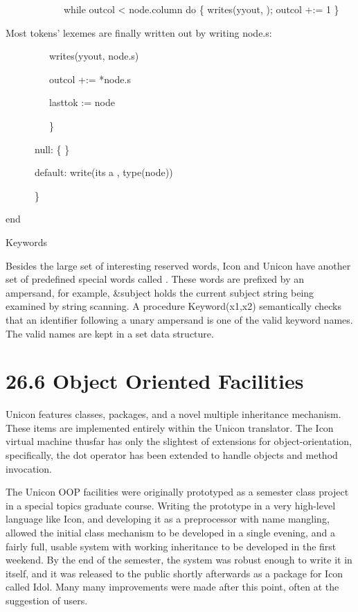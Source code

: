 {\ttfamily\mdseries
\ \ \ \ \ \ \ \ \ \ \ \ while outcol {\textless} node.column do \{ writes(yyout, {\textquotedbl} {\textquotedbl});
outcol +:= 1 \}}


Most tokens' lexemes are finally written out by writing node.s: 

{\ttfamily\mdseries
\ \ \ \ \ \ \ \ \ writes(yyout, node.s)}

{\ttfamily\mdseries
\ \ \ \ \ \ \ \ \ outcol +:= *node.s}

{\ttfamily\mdseries
\ \ \ \ \ \ \ \ \ lasttok := node}

{\ttfamily\mdseries
\ \ \ \ \ \ \ \ \ \}}

{\ttfamily\mdseries
\ \ \ \ \ \ {\textquotedbl}null{\textquotedbl}: \{ \}}

{\ttfamily\mdseries
\ \ \ \ \ \ default: write({\textquotedbl}its a {\textquotedbl}, type(node))}

{\ttfamily\mdseries
\ \ \ \ \ \ \}}

{\ttfamily\mdseries
end}

{\sffamily
Keywords }


Besides the large set of interesting reserved words, Icon and Unicon
have another set of predefined special words called
. These words are prefixed by an
ampersand, for example, \&subject holds the current
{\textquotedbl}subject{\textquotedbl} string being examined by string
scanning. A procedure Keyword(x1,x2) semantically checks that an
identifier following a unary ampersand is one of the valid keyword
names. The valid names are kept in a set data structure.


\section[26.6 Object Oriented Facilities]{26.6 Object Oriented Facilities}

Unicon features classes, packages, and a novel multiple inheritance
mechanism. These items are implemented entirely within the Unicon
translator. The Icon virtual machine thusfar has only the slightest of
extensions for object-orientation, specifically, the dot operator has
been extended to handle objects and method invocation.

The Unicon OOP facilities were originally prototyped as a semester
class project in a {\textquotedbl}special topics{\textquotedbl}
graduate course. Writing the prototype in a very high-level language
like Icon, and developing it as a preprocessor with name mangling,
allowed the initial class mechanism to be developed in a single
evening, and a fairly full, usable system with working inheritance to
be developed in the first weekend. By the end of the semester, the
system was robust enough to write it in itself, and it was released to
the public shortly afterwards as a package for Icon called
{\textquotedbl}Idol{\textquotedbl}. Many many improvements were made
after this point, often at the suggestion of users.

